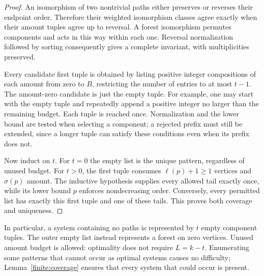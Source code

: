 \begin{proof}
An isomorphism of two nontrivial paths either preserves or reverses
their endpoint order.  Therefore their weighted isomorphism classes
agree exactly when their amount tuples agree up to reversal.  A forest
isomorphism permutes components and acts in this way within each one.
Reversal normalization followed by sorting consequently gives a
complete invariant, with multiplicities preserved.

Every candidate first tuple is obtained by listing positive integer
compositions of each amount from zero to $B$, restricting the number
of entries to at most $t-1$.  The amount-zero candidate is just the
empty tuple.  For example, one may start with the empty tuple and
repeatedly append a positive integer no larger than the remaining
budget.  Each tuple is reached once.  Normalization and the lower bound
are tested when selecting a component; a rejected prefix must still
be extended, since a longer tuple can satisfy these conditions even
when its prefix does not.

Now induct on $t$.  For $t=0$ the empty list is the unique pattern,
regardless of unused budget.  For $t>0$, the first tuple consumes
$\ell(p)+1\ge1$ vertices and $\sigma(p)$ amount.  The inductive
hypothesis supplies every allowed tail exactly once, while its lower
bound $p$ enforces nondecreasing order.  Conversely, every permitted
list has exactly this first tuple and one of these tails.  This proves
both coverage and uniqueness.
\end{proof}

In particular, a system containing no paths is represented by $t$
empty component tuples.  The outer empty list instead represents a
forest on zero vertices.  Unused amount budget is allowed: optimality
does not require $L=k-t$.  Enumerating some patterns that cannot occur
as optimal systems causes no difficulty; Lemma~\ref{finite:coverage}
ensures that every system that could occur is present.

